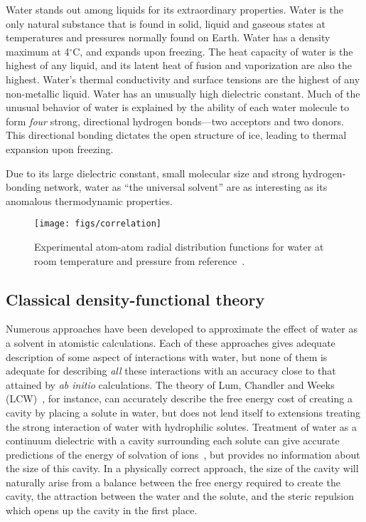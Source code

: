 \documentclass[letterpaper,twocolumn,amsmath,amssymb,prb]{revtex4-1}
\begin{document}
Water stands out among liquids for its extraordinary properties.  Water is
the only natural substance that is found in solid, liquid and gaseous
states at temperatures and pressures normally found on Earth.  Water has a
density maximum at 4$^\circ$C, and expands upon freezing.  The heat
capacity of water is the highest of any liquid, and its latent heat of
fusion and vaporization are also the highest.  Water's thermal conductivity
and surface tensions are the highest of any non-metallic liquid.  Water has
an unusually high dielectric constant.
Much of the unusual behavior of water is explained by the ability of each
water molecule to form \emph{four} strong, directional hydrogen bonds---two
acceptors and two donors.  This directional bonding dictates the open
structure of ice, leading to thermal expansion upon freezing.

Due to its large dielectric constant, small molecular size and strong
hydrogen-bonding network, water as ``the universal solvent'' are as
interesting as its anomalous thermodynamic properties.

\begin{figure}
\texttt{[image: figs/correlation]}
\caption{ Experimental atom-atom radial distribution functions for water at
room temperature and pressure from reference~\cite{Soper2000}.  }
\label{correlation}
\end{figure}

\subsection{Classical density-functional theory}

Numerous approaches have been developed to approximate the effect of water
as a solvent in atomistic calculations.  Each of these approaches gives
adequate description of some aspect of interactions with water, but none of
them is adequate for describing \emph{all} these interactions with an
accuracy close to that attained by \emph{ab initio} calculations.  The
theory of Lum, Chandler and Weeks (LCW)~\cite{LCW}, for instance, can
accurately describe the free energy cost of creating a cavity by placing a
solute in water, but does not lend itself to extensions treating the strong
interaction of water with hydrophilic solutes.  Treatment of water as a
continuum dielectric with a cavity surrounding each solute can give
accurate predictions of the energy of solvation of ions~\cite{latimer1939,
rashin1985, zhan1998, hsu1999, hildebrandt2004, hildebrandt2007}, but
provides no information about the size of this cavity.  In a physically
correct approach, the size of the cavity will naturally arise from a
balance between the free energy required to create the cavity, the
attraction between the water and the solute, and the steric repulsion which
opens up the cavity in the first place.
\end{document}
